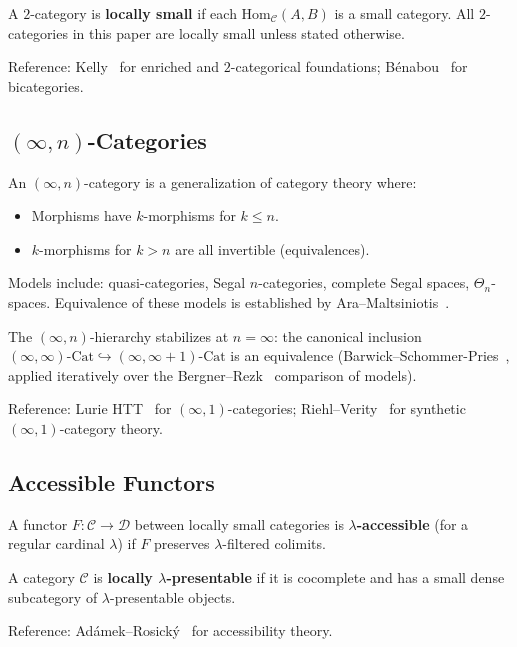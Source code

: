 \documentclass[11pt]{article}
\theoremstyle{plain}
\theoremstyle{definition}
\newcommand{\cC}{\mathcal{C}}
\newcommand{\cD}{\mathcal{D}}
\newcommand{\Hom}{\mathrm{Hom}}
\newcommand{\Cat}{\mathrm{Cat}}
\begin{document}
A $2$-category is \textbf{locally small} if each $\Hom_\cC(A, B)$ is a small category. All $2$-categories in this paper are locally small unless stated otherwise.

Reference: Kelly~\cite{Kelly1982} for enriched and $2$-categorical foundations; B\'enabou~\cite{Benabou1967} for bicategories.

\subsection{\texorpdfstring{$(\infty, n)$-Categories}{(infinity,n)-Categories}}

An $(\infty, n)$-category is a generalization of category theory where:
\begin{itemize}
\item Morphisms have $k$-morphisms for $k \leq n$.
\item $k$-morphisms for $k > n$ are all invertible (equivalences).
\end{itemize}

Models include: quasi-categories, Segal $n$-categories, complete Segal spaces, $\Theta_n$-spaces. Equivalence of these models is established by Ara--Maltsiniotis~\cite{AraMaltsiniotis2017}.

The $(\infty, n)$-hierarchy stabilizes at $n = \infty$: the canonical inclusion $(\infty, \infty)\text{-}\Cat \hookrightarrow (\infty, \infty + 1)\text{-}\Cat$ is an equivalence (Barwick--Schommer-Pries~\cite{BarwickSchommerPries2021}, applied iteratively over the Bergner--Rezk~\cite{BergnerRezk2013} comparison of models).

Reference: Lurie HTT~\cite{LurieHTT} for $(\infty, 1)$-categories; Riehl--Verity~\cite{RiehlVerity2022} for synthetic $(\infty, 1)$-category theory.

\subsection{Accessible Functors}

A functor $F : \cC \to \cD$ between locally small categories is \textbf{$\lambda$-accessible} (for a regular cardinal $\lambda$) if $F$ preserves $\lambda$-filtered colimits.

A category $\cC$ is \textbf{locally $\lambda$-presentable} if it is cocomplete and has a small dense subcategory of $\lambda$-presentable objects.

Reference: Ad\'amek--Rosick\'y~\cite{AdamekRosicky1994} for accessibility theory.
\end{document}
